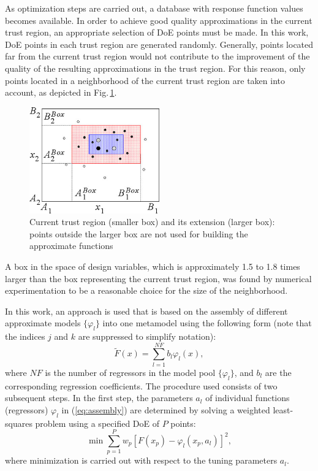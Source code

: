 \documentclass[a4paper]{llncs}
\begin{document}
As optimization steps are carried out, a database with response function values
becomes available. In order to achieve good quality approximations in the
current trust region, an appropriate selection of DoE points must be made. In
this work, DoE points in each trust region are generated randomly. Generally,
points located far from the current trust region would not contribute to the
improvement of the quality of the resulting approximations in the trust region.
For this reason, only points located in a neighborhood of the current trust
region are taken into account, as depicted in Fig.\,\ref{fig:trustregion}.
\begin{figure}[ht]
    \centering
    \includegraphics[width=0.5\textwidth]{trustregion.png}
    \caption{Current trust region (smaller box) and its extension (larger box):
    points outside the larger box are not used for building the approximate
    functions}
    \label{fig:trustregion}
\end{figure}
A box in the space of design variables, which is approximately 1.5 to 1.8 times
larger than the box representing the current trust region, was found by
numerical experimentation to be a reasonable choice for the size of the
neighborhood.

In this work, an approach is used that is based on the assembly of different
approximate models $\{\varphi_l\}$ into one metamodel using the following form
(note that the indices $j$ and $k$ are suppressed to simplify notation):
\begin{equation}\label{eq:assembly}
\widetilde{F}(x) = \sum_{l=1}^{NF}{b_l\varphi_l(x)},
\end{equation}
where $NF$ is the number of regressors in the model pool $\{\varphi_l\}$, and
$b_l$ are the corresponding regression coefficients. The  procedure used
consists of two subsequent steps. In the first step, the parameters $a_l$ of
individual functions (regressors) $\varphi_l$ in (\ref{eq:assembly}) are
determined by solving a weighted least-squares problem using a specified DoE of
$P$ points:
\[
\min \sum_{p=1}^P{w_{p}\left[ F(x_p)- \varphi_l(x_p,a_l) \right]^2},
\]
where minimization is carried out with respect to the tuning parameters $a_l$.
\end{document}
